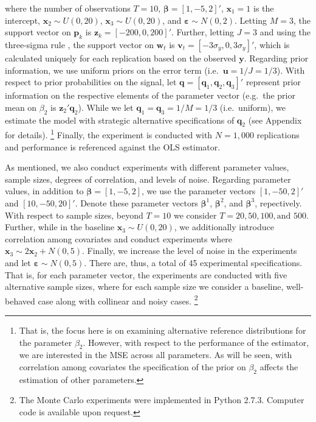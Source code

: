 \documentclass[english]{article}
\begin{document}
\noindent
where the number of observations $T=10$, $\mathbf{\beta}=[1, -5, 2]'$,
$\mathbf{x}_1=1$ is the intercept, $\mathbf{x}_2 \sim U(0,20)$, 
$\mathbf{x}_3 \sim U(0,20)$, and $\mathbf{\varepsilon}\sim N(0,2)$.
Letting $M=3$, the support vector on $\mathbf{p}_k$ is $\mathbf{z}_k 
= [- 200, 0, 200]'$.
Further, letting $J=3$ and using the three-sigma rule 
\citep{pukelsheim1994}, the support vector on $\mathbf{w}_t$ is 
$\mathbf{v}_t = [- 3\sigma_y, 0, 3\sigma_y]'$, which is calculated uniquely 
for each replication based on the observed $\mathbf{y}$.
Regarding prior information, we use uniform priors on the error term (i.e.\ 
$\mathbf{u} = 1/J = 1/3$).
With respect to prior probabilities on the signal, let $\mathbf{q} = 
[\mathbf{q}_1, \mathbf{q}_2, \mathbf{q}_3]'$ represent prior 
information on the respective elements of the parameter vector (e.g.\ 
the prior mean on $\beta_2$ is $\mathbf{z}_2' \mathbf{q}_2$).
While we let $\mathbf{q}_1 = \mathbf{q}_3 = 1/M = 1/3$ (i.e.\
uniform), we estimate the model with strategic alternative specifications 
of $\mathbf{q}_2$ (see Appendix for details).%
\footnote{That is, the focus here is on examining alternative reference 
distributions for the parameter $\beta_2$. 
However, with respect to the performance of the estimator, we are 
interested in the MSE across all parameters.
As will be seen, with correlation among covariates the specification of the 
prior on $\beta_2$ affects the estimation of other parameters.}
Finally, the experiment is conducted with $N=1,000$ replications and 
performance is referenced against the OLS estimator.

As mentioned, we also conduct experiments with different parameter 
values, sample sizes, degrees of correlation, and levels of noise. 
Regarding parameter values, in addition to $\mathbf{\beta}=[1,-5,2]$, we
use the parameter vectors $[1,-50,2]'$ and $[10,-50,20]'$. 
Denote these parameter vectors $\mathbf{\beta}^1$, 
$\mathbf{\beta}^2$, and $\mathbf{\beta}^3$, repectively.
With respect to sample sizes, beyond $T=10$ we consider $T=20, 50, 100, 
\text{and } 500$. 
Further, while in the baseline $\mathbf{x}_3 \sim U(0, 20)$, we 
additionally introduce correlation among covariates and conduct 
experiments where $\mathbf{x}_3 \sim 2 \mathbf{x}_2 + N(0, 5)$.
Finally, we increase the level of noise in the experiments and let 
$\mathbf{\varepsilon}\sim N(0,5)$.
There are, thus, a total of 45 experimental specifications. 
That is, for each parameter vector, the experiments are conducted with 
five alternative sample sizes, where for each sample size we consider 
a baseline, well-behaved case along with collinear and noisy cases.%
\footnote{The Monte Carlo experiments were implemented in Python 
2.7.3. 
Computer code is available upon request.}
\end{document}
